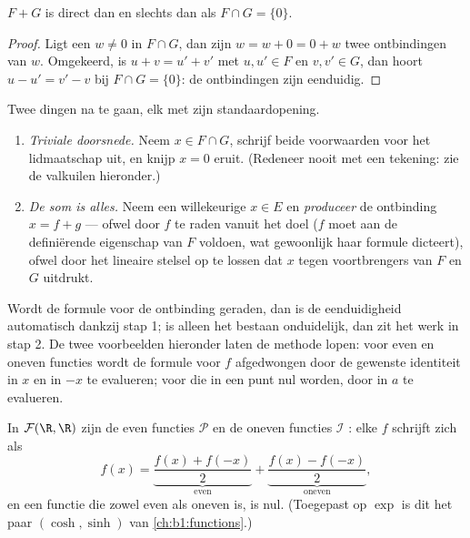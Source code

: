 \begin{proposition}\label{prop:b1:vspaces:directsum}
$F + G$ is direct dan en slechts dan als $F \cap G = \{0\}$.
\end{proposition}

\begin{proof}
Ligt een $w \neq 0$ in $F \cap G$, dan zijn $w = w + 0 = 0 + w$ twee
ontbindingen van $w$. Omgekeerd, is $u + v = u' + v'$ met $u, u' \in
F$ en $v, v' \in G$, dan hoort $u - u' = v' - v$ bij $F \cap G =
\{0\}$: de ontbindingen zijn eenduidig.
\end{proof}

\begin{method}[Bewijzen dat $E = F \oplus G$]
\label{met:b1:vspaces:directsum}
Twee dingen na te gaan, elk met zijn standaardopening.
\begin{enumerate}
  \item \emph{Triviale doorsnede.} Neem $x \in F \cap G$, schrijf
        beide voorwaarden voor het lidmaatschap uit, en knijp $x =
        0$ eruit. (Redeneer nooit met een tekening: zie de
        valkuilen hieronder.)
  \item \emph{De som is alles.} Neem een willekeurige $x \in E$ en
        \emph{produceer} de ontbinding $x = f + g$ --- ofwel door
        $f$ te raden vanuit het doel ($f$ moet aan de definiërende
        eigenschap van $F$ voldoen, wat gewoonlijk haar formule
        dicteert), ofwel door het lineaire stelsel op te lossen dat
        $x$ tegen voortbrengers van $F$ en $G$ uitdrukt.
\end{enumerate}
Wordt de formule voor de ontbinding geraden, dan is de
eenduidigheid automatisch dankzij stap 1; is alleen het bestaan
onduidelijk, dan zit het werk in stap 2. De twee voorbeelden
hieronder laten de methode lopen: voor even en oneven functies
wordt de formule voor $f$ afgedwongen door de gewenste identiteit
in $x$ en in $-x$ te evalueren; voor  die in een punt nul
worden, door in $a$ te evalueren.
\end{method}

\begin{example}\label{ex:b1:vspaces:evenodd}
In $\mathcal{F}(\R, \R)$ zijn de even functies $\mathcal{P}$ en de
oneven functies $\mathcal{I}$ : elke $f$ schrijft zich
als
\[
f(x) = \underbrace{\frac{f(x) + f(-x)}{2}}_{\text{even}}
+ \underbrace{\frac{f(x) - f(-x)}{2}}_{\text{oneven}},
\]
en een functie die zowel even als oneven is, is nul. (Toegepast op
$\exp$ is dit het paar $(\cosh, \sinh)$ van
\cref{ch:b1:functions}.)
\end{example}

